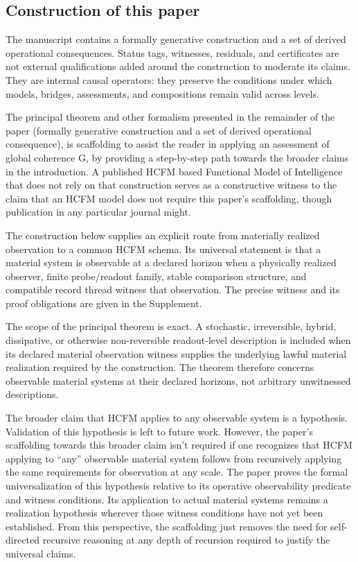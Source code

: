 \documentclass[11pt]{article}
\theoremstyle{definition}
\begin{document}
\subsection{Construction of this paper}
The manuscript contains a formally generative construction and a set of derived operational consequences. Status tags, witnesses, residuals, and certificates are not external qualifications added around the construction to moderate its claims. They are internal causal operators: they preserve the conditions under which models, bridges, assessments, and compositions remain valid across levels.

The principal theorem and other formalism presented in the remainder of the paper (formally generative construction and a set of derived operational consequence), is scaffolding to assist the reader in applying an assessment of global coherence G, by providing a step-by-step path towards the broader claims in the introduction. A published HCFM based Functional Model of Intelligence\cite{williams2023human} that does not rely on that construction serves as a constructive witness to the claim that an HCFM model does not require this paper’s scaffolding, though publication in any particular journal might.

The construction below supplies an explicit route from materially realized observation to a common HCFM schema. Its universal statement is that a material system is observable at a declared horizon when a physically realized observer, finite probe/readout family, stable comparison structure, and compatible record thread witness that observation. The precise witness and its proof obligations are given in the Supplement.

The scope of the principal theorem is exact. A stochastic, irreversible, hybrid, dissipative, or otherwise non-reversible readout-level description is included when its declared material observation witness supplies the underlying lawful material realization required by the construction. The theorem therefore concerns observable material systems at their declared horizons, not arbitrary unwitnessed descriptions.

The broader claim that HCFM applies to any observable system is a hypothesis. Validation of this hypothesis is left to future work. However, the paper's scaffolding towards this broader claim isn't required if one recognizes that HCFM applying to “any” observable material system follows from recursively applying the same requirements for observation at any scale. The paper proves the formal universalization of this hypothesis relative to its operative observability predicate and witness conditions. Its application to actual material systems remains a realization hypothesis wherever those witness conditions have not yet been established. From this perspective, the scaffolding just removes the need for self-directed recursive reasoning at any depth of recursion required to justify the universal claims. 
\end{document}
